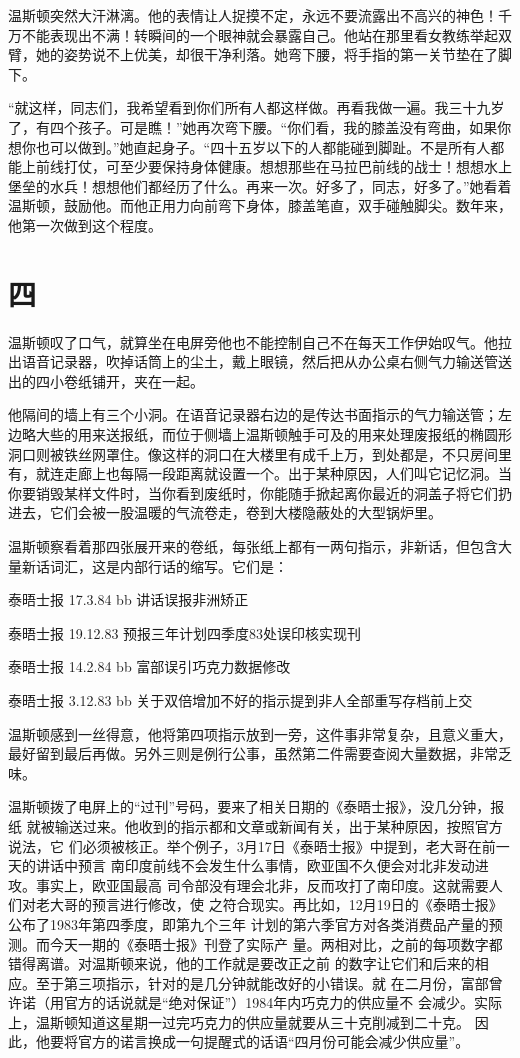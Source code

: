 温斯顿突然大汗淋漓。他的表情让人捉摸不定，永远不要流露出不高兴的神色！千万不能表现出不满！转瞬间的一个眼神就会暴露自己。他站在那里看女教练举起双臂，她的姿势说不上优美，却很干净利落。她弯下腰，将手指的第一关节垫在了脚下。

``就这样，同志们，我希望看到你们所有人都这样做。再看我做一遍。我三十九岁了，有四个孩子。可是瞧！''她再次弯下腰。``你们看，我的膝盖没有弯曲，如果你想你也可以做到。''她直起身子。``四十五岁以下的人都能碰到脚趾。不是所有人都能上前线打仗，可至少要保持身体健康。想想那些在马拉巴前线的战士！想想水上堡垒的水兵！想想他们都经历了什么。再来一次。好多了，同志，好多了。''她看着温斯顿，鼓励他。而他正用力向前弯下身体，膝盖笔直，双手碰触脚尖。数年来，他第一次做到这个程度。

\section*{四}\label{ux56db}

温斯顿叹了口气，就算坐在电屏旁他也不能控制自己不在每天工作伊始叹气。他拉出语音记录器，吹掉话筒上的尘土，戴上眼镜，然后把从办公桌右侧气力输送管送出的四小卷纸铺开，夹在一起。

他隔间的墙上有三个小洞。在语音记录器右边的是传达书面指示的气力输送管；左边略大些的用来送报纸，而位于侧墙上温斯顿触手可及的用来处理废报纸的椭圆形洞口则被铁丝网罩住。像这样的洞口在大楼里有成千上万，到处都是，不只房间里有，就连走廊上也每隔一段距离就设置一个。出于某种原因，人们叫它记忆洞。当你要销毁某样文件时，当你看到废纸时，你能随手掀起离你最近的洞盖子将它们扔进去，它们会被一股温暖的气流卷走，卷到大楼隐蔽处的大型锅炉里。

温斯顿察看着那四张展开来的卷纸，每张纸上都有一两句指示，非新话，但包含大量新话词汇，这是内部行话的缩写。它们是：

泰晤士报 17.3.84 bb 讲话误报非洲矫正

泰晤士报 19.12.83 预报三年计划四季度83处误印核实现刊

泰晤士报 14.2.84 bb 富部误引巧克力数据修改

泰晤士报 3.12.83 bb 关于双倍增加不好的指示提到非人全部重写存档前上交

温斯顿感到一丝得意，他将第四项指示放到一旁，这件事非常复杂，且意义重大，最好留到最后再做。另外三则是例行公事，虽然第二件需要查阅大量数据，非常乏味。

温斯顿拨了电屏上的``过刊''号码，要来了相关日期的《泰晤士报》，没几分钟，报纸
就被输送过来。他收到的指示都和文章或新闻有关，出于某种原因，按照官方说法，它
们必须被核正。举个例子，3月17日《泰晤士报》中提到，老大哥在前一天的讲话中预言
南印度前线不会发生什么事情，欧亚国不久便会对北非发动进攻。事实上，欧亚国最高
司令部没有理会北非，反而攻打了南印度。这就需要人们对老大哥的预言进行修改，使
之符合现实。再比如，12月19日的《泰晤士报》公布了1983年第四季度，即第九个三年
计划的第六季官方对各类消费品产量的预测。而今天一期的《泰晤士报》刊登了实际产
量。两相对比，之前的每项数字都错得离谱。对温斯顿来说，他的工作就是要改正之前
的数字让它们和后来的相应。至于第三项指示，针对的是几分钟就能改好的小错误。就
在二月份，富部曾许诺（用官方的话说就是``绝对保证''）1984年内巧克力的供应量不
会减少。实际上，温斯顿知道这星期一过完巧克力的供应量就要从三十克削减到二十克。
因此，他要将官方的诺言换成一句提醒式的话语``四月份可能会减少供应量''。

